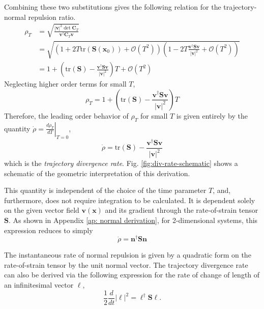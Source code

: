 \documentclass[twocolumn]{svjour3}
\begin{document}
Combining these two substitutions gives the following relation for the trajectory-normal repulsion ratio.
\begin{equation}
\begin{aligned}
\rho_T  &= \sqrt{\frac{
| \mathbf{v} |^2 \det\mathbf{C}_T }{
\mathbf{v} ^\dagger\mathbf{C}_T  \mathbf{v} 
}} \\
&= \sqrt{\left(1 + 2T\text{tr}\left(\mathbf{S}\left(\mathbf{x}_0\right)\right)+\mathcal{O}(T^2)\right)\left(1-2T \frac{\mathbf{v} ^\dagger\mathbf{S} \mathbf{v} }{\left|\mathbf{v} \right|^2}+\mathcal{O}(T^2)\right)} \\
&= 1+\left(\text{tr}(\mathbf{S} )-\frac{\mathbf{v} ^\dagger \mathbf{S} \mathbf{v} }{\left|\mathbf{v} \right|^2}\right)T + \mathcal{O}(T^2)
\end{aligned}
\end{equation}
Neglecting higher order terms for small $T$, 
\begin{equation}
\rho_T  = 1+\left(\text{tr}(\mathbf{S} )-\frac{\mathbf{v} ^\dagger \mathbf{S} \mathbf{v} }{\left|\mathbf{v} \right|^2}\right)T
\label{eq:local Rho}
\end{equation}
Therefore, the leading order behavior of \(\rho_T \) for small $T$ is given entirely by the quantity $\dot \rho = \left.\frac{d \rho_T}{dT}\right|_{T=0}$,
\begin{equation}
\dot \rho   = \text{tr}(\mathbf{S} )-\frac{\mathbf{v} ^\dagger \mathbf{S} \mathbf{v} }{\left|\mathbf{v} \right|^2}
\label{eq:Leading Order Behavior}
\end{equation}
which is the {\it trajectory divergence rate}. Fig. \ref{fig:div-rate-schematic} shows a schematic of the geometric interpretation of this derivation.

This quantity is independent of the choice of the time parameter \(T\), and, furthermore, does not require integration to be calculated. It is dependent solely on the given vector field $\mathbf{v}(\mathbf{x})$	and its gradient through the rate-of-strain tensor
$\mathbf{S} $. As shown in Appendix \ref{ap: normal derivation}, for 2-dimensional systems, this expression reduces to simply
\begin{equation}
\dot{\rho}  = \mathbf{n}^\dagger\mathbf{S} \mathbf{n}
\label{eq:DivRate}
\end{equation}

The instantaneous rate of normal repulsion is given by a quadratic form on the  rate-of-strain tensor by the unit normal vector. The trajectory divergence rate can also be derived via the following expression for the rate of change of length of an infinitesimal vector $\ell$,
\begin{equation}
\frac{1}{2}\frac{d}{dt}\left|\ell\right|^2 = \ell^\dagger\mathbf{S}\ell.
\end{equation}
\end{document}
